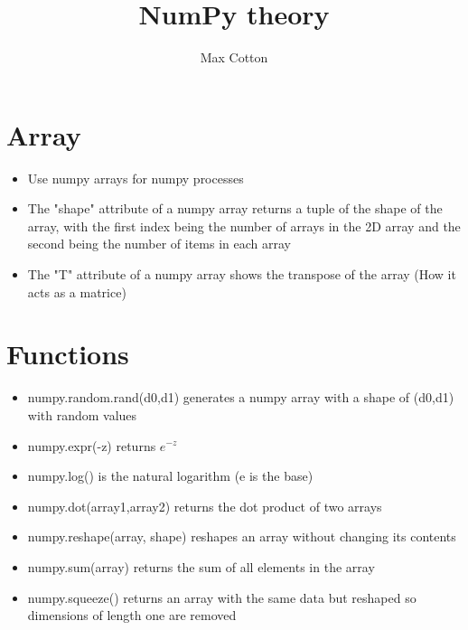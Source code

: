 \documentclass[10pt,a4paper]{article}
\title{NumPy theory}
\author{Max Cotton}
\date{}
\begin{document}
\maketitle

\section{Array}

\begin{itemize}
    \item Use numpy arrays for numpy processes
    \item The "shape" attribute of a numpy array returns a tuple of the shape of the array, with the first index being the number of arrays in the 2D array and the second being the number of items in each array
    \item The "T" attribute of a numpy array shows the transpose of the array (How it acts as a matrice)
\end{itemize}

\section{Functions}

\begin{itemize}
    \item numpy.random.rand(d0,d1) generates a numpy array with a shape of (d0,d1) with random values
    \item numpy.expr(-z) returns $e^{-z}$
    \item numpy.log() is the natural logarithm (e is the base)
    \item numpy.dot(array1,array2) returns the dot product of two arrays
    \item numpy.reshape(array, shape) reshapes an array without changing its contents
    \item numpy.sum(array) returns the sum of all elements in the array
    \item numpy.squeeze() returns an array with the same data but reshaped so dimensions of length one are removed
\end{itemize}
\end{document}

